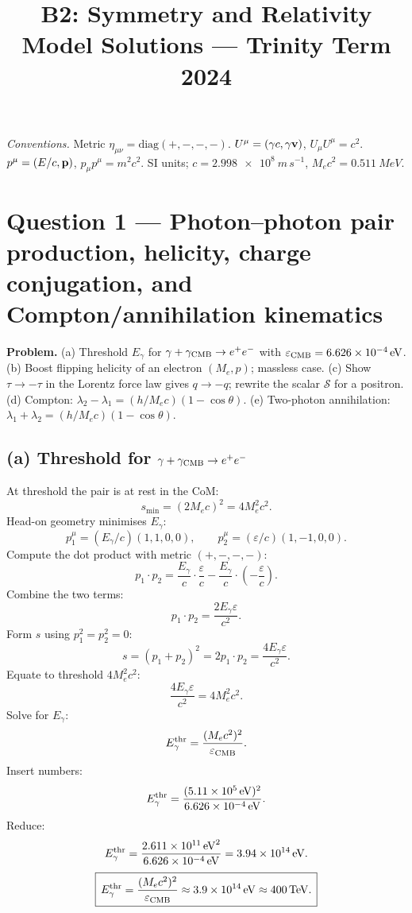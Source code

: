 \documentclass[11pt]{article}
\title{B2: Symmetry and Relativity\\ Model Solutions --- Trinity Term 2024}
\author{}
\date{}
\begin{document}
\maketitle

\noindent\textit{Conventions.} Metric $\eta_{\mu\nu}=\mathrm{diag}(+,-,-,-)$. $U^\mu=(\gamma c,\gamma\vb v)$, $U_\mu U^\mu=c^2$. $p^\mu=(E/c,\vb p)$, $p_\mu p^\mu=m^2c^2$. SI units; $c=\SI{2.998e8}{m\,s^{-1}}$, $M_e c^2=\SI{0.511}{MeV}$.

\section*{Question 1 --- Photon--photon pair production, helicity, charge conjugation, and Compton/annihilation kinematics}

\textbf{Problem.} (a) Threshold $E_\gamma$ for $\gamma+\gamma_{\rm CMB}\to e^+e^-$ with $\varepsilon_{\rm CMB}=\SI{6.626e-4}{eV}$. (b) Boost flipping helicity of an electron $(M_e,p)$; massless case. (c) Show $\tau\to-\tau$ in the Lorentz force law gives $q\to-q$; rewrite the scalar $\mathcal{S}$ for a positron. (d) Compton: $\lambda_2-\lambda_1=(h/M_ec)(1-\cos\theta)$. (e) Two-photon annihilation: $\lambda_1+\lambda_2=(h/M_ec)(1-\cos\theta)$.

\subsection*{(a) Threshold for $\gamma+\gamma_{\rm CMB}\to e^+e^-$}

At threshold the pair is at rest in the CoM:
\[ s_{\min}=(2M_ec)^2=4M_e^2c^2. \]
Head-on geometry minimises $E_\gamma$:
\[ p_1^\mu=(E_\gamma/c)(1,1,0,0),\qquad p_2^\mu=(\varepsilon/c)(1,-1,0,0). \]
Compute the dot product with metric $(+,-,-,-)$:
\[ p_1\cdot p_2=\frac{E_\gamma}{c}\cdot\frac{\varepsilon}{c}-\frac{E_\gamma}{c}\cdot\left(-\frac{\varepsilon}{c}\right). \]
Combine the two terms:
\[ p_1\cdot p_2=\frac{2E_\gamma\varepsilon}{c^2}. \]
Form $s$ using $p_1^2=p_2^2=0$:
\[ s=(p_1+p_2)^2=2p_1\cdot p_2=\frac{4E_\gamma\varepsilon}{c^2}. \]
Equate to threshold $4M_e^2c^2$:
\[ \frac{4E_\gamma\varepsilon}{c^2}=4M_e^2c^2. \]
Solve for $E_\gamma$:
\[ E_\gamma^{\rm thr}=\frac{(M_ec^2)^2}{\varepsilon_{\rm CMB}}. \]
Insert numbers:
\[ E_\gamma^{\rm thr}=\frac{(\SI{5.11e5}{eV})^2}{\SI{6.626e-4}{eV}}. \]
Reduce:
\[ E_\gamma^{\rm thr}=\frac{\SI{2.611e11}{eV^2}}{\SI{6.626e-4}{eV}}=\SI{3.94e14}{eV}. \]
\begin{equation}
\boxed{\,E_\gamma^{\rm thr}=\frac{(M_ec^2)^2}{\varepsilon_{\rm CMB}}\approx\SI{3.9e14}{eV}\approx\SI{400}{TeV}.\,}
\end{equation}
\end{document}
